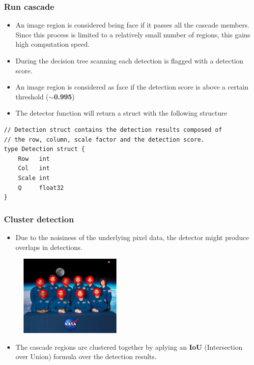 \documentclass[9pt]{beamer}
\begin{document}
\begin{frame}[fragile]
\frametitle{Run cascade}


\begin{itemize}
\item An image region is considered being face if it passes all the cascade members. Since this process is limited to a relatively small number of regions, this gains high computation speed.
\item During the decision tree scanning each detection is flagged with a detection score.
\item An image region is considered as face if the detection score is above a certain threshold (\textbf{$\sim$0.995})
\item The detector function will return a struct with the following structure
\end{itemize}


\begin{verbatim}
// Detection struct contains the detection results composed of
// the row, column, scale factor and the detection score.
type Detection struct {
    Row   int
    Col   int
    Scale int
    Q     float32
}

\end{verbatim}



\end{frame}

\begin{frame}[fragile]
\frametitle{Cluster detection}


\begin{itemize}
\item Due to the noisiness of the underlying pixel data, the detector might produce overlaps in detections.
\end{itemize}

\begin{figure}[h]
\begin{center}
\includegraphics[width=5cm,height=4cm]{assets/pigo_output_without_clustering-1024x819.png}
\end{center}

\end{figure}

\begin{itemize}
\item The cascade regions are clustered together by aplying an \textbf{IoU} (Intersection over Union) formula over the detection results.
\end{itemize}


\end{frame}
\end{document}
